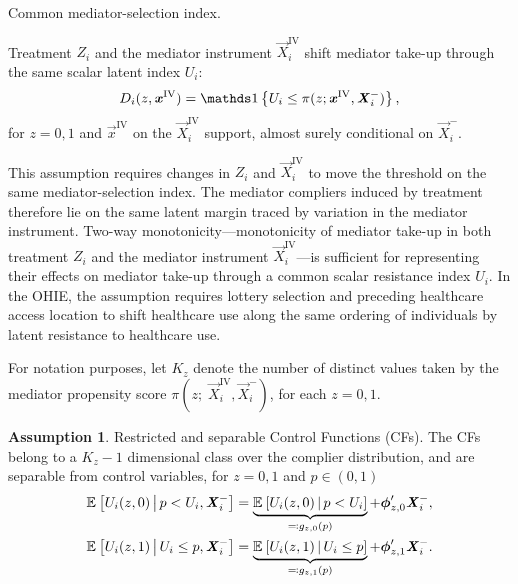 \begin{assumptionMTE}
    \label{mte:joint-monotonicity}
    Common mediator-selection index.
    
    Treatment $Z_i$ and the mediator instrument $\vec X_i^{\mathrm{IV}}$ shift mediator take-up through the same scalar latent index $U_i$:
    \[ D_i(z,\vec x^{\mathrm{IV}}) = \indicator{ U_i \leq \pi(z;\vec x^{\mathrm{IV}},\vec X_i^-) }, \]
    for $z=0,1$ and $\vec x^{\mathrm{IV}}$ on the $\vec X_i^{\mathrm{IV}}$ support, almost surely conditional on $\vec X_i^-$.
\end{assumptionMTE}
This assumption requires changes in $Z_i$ and $\vec X_i^{\mathrm{IV}}$ to move the threshold on the same mediator-selection index.
The mediator compliers induced by treatment therefore lie on the same latent margin traced by variation in the mediator instrument.
Two-way monotonicity---monotonicity of mediator take-up in both treatment $Z_i$ and the mediator instrument $\vec X_i^{\mathrm{IV}}$---is sufficient for representing their effects on mediator take-up through a common scalar resistance index $U_i$.
In the OHIE, the assumption requires lottery selection and preceding healthcare access location to shift healthcare use along the same ordering of individuals by latent resistance to healthcare use.

For notation purposes, let $K_z$ denote the number of distinct values taken by the mediator propensity score $\pi(z;\; \vec X_i^{\mathrm{IV}}, \vec X_i^-)$, for each $z=0,1$.
\theoremstyle{definition}
\newtheorem{assumptionMTECF}{Assumption}
\renewcommand\theassumptionMTECF{MTE--CF}
\begin{assumptionMTECF}
    \label{mte:restricted-cf}
    Restricted and separable Control Functions (CFs).
    The CFs belong to a $K_z - 1$ dimensional class over the complier distribution, and are separable from control variables,
    for $z=0,1$ and $p \in (0,1)$
    \begin{align*}
        \mathbb{E}_{} \left[ U_i(z, 0) \, \middle\vert \, p<U_i, \boldsymbol{\mathit{X}}_i^- \right]
        &= \underbrace{\mathbb{E}_{} \left[ U_i(z,0) \, \middle\vert \, p<U_i \right]}_{\eqqcolon g_{z,0}(p)}
        + \boldsymbol{\mathit{\phi}}_{z,0}' \boldsymbol{\mathit{X}}_i^-, \\
        \mathbb{E}_{} \left[ U_i(z,1) \, \middle\vert \, U_i\leq p, \boldsymbol{\mathit{X}}_i^- \right]
        &= \underbrace{\mathbb{E}_{} \left[ U_i(z,1) \, \middle\vert \, U_i\leq p \right]}_{\eqqcolon g_{z,1}(p)}
        + \boldsymbol{\mathit{\phi}}_{z,1}' \boldsymbol{\mathit{X}}_i^-.
    \end{align*}
\end{assumptionMTECF}

